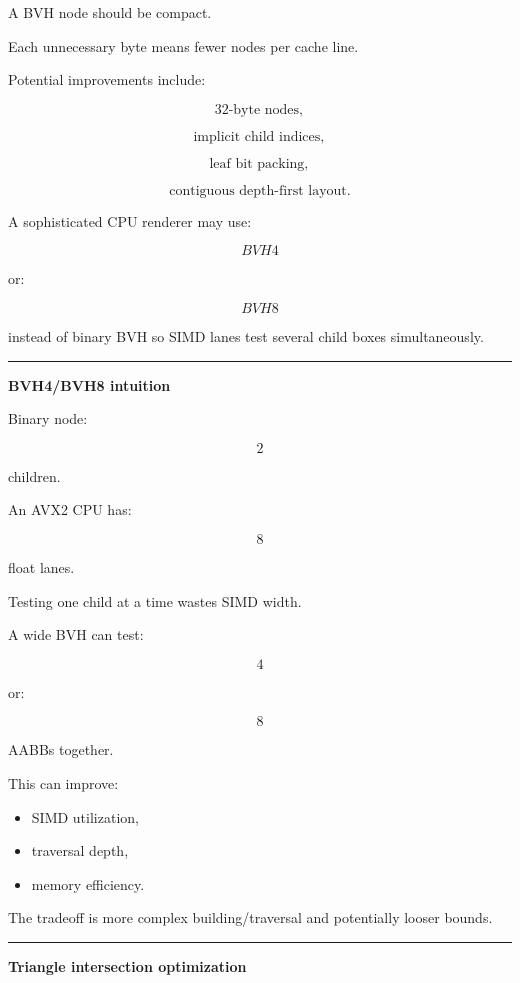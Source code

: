 A BVH node should be compact.

Each unnecessary byte means fewer nodes per cache line.

Potential improvements include:

\[
\text{32-byte nodes},
\]

\[
\text{implicit child indices},
\]

\[
\text{leaf bit packing},
\]

\[
\text{contiguous depth-first layout}.
\]

A sophisticated CPU renderer may use:

\[
BVH4
\]

or:

\[
BVH8
\]

instead of binary BVH so SIMD lanes test several child boxes simultaneously.

\begin{center}\rule{0.5\linewidth}{0.5pt}\end{center}

\textbf{BVH4/BVH8 intuition}

Binary node:

\[
2
\]

children.

An AVX2 CPU has:

\[
8
\]

float lanes.

Testing one child at a time wastes SIMD width.

A wide BVH can test:

\[
4
\]

or:

\[
8
\]

AABBs together.

This can improve:

\begin{itemize}
\tightlist
\item
  SIMD utilization,
\item
  traversal depth,
\item
  memory efficiency.
\end{itemize}

The tradeoff is more complex building/traversal and potentially looser bounds.

\begin{center}\rule{0.5\linewidth}{0.5pt}\end{center}

\textbf{Triangle intersection optimization}

